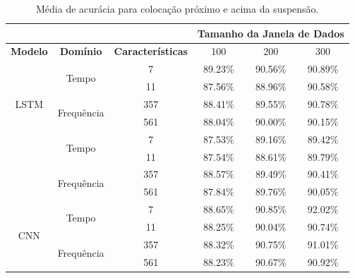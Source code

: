 \begin{table}[h!]
\scriptsize
\centering
\caption{Média de acurácia para colocação próximo e acima da suspensão.}
\label{table:above_suspension_results_tipo_superficie_2}
\begin{tabular}{cccccc}
\cmidrule(l){4-6}
 & \multicolumn{1}{l}{\textbf{}} & \multicolumn{1}{l}{} & \multicolumn{3}{c}{\textbf{Tamanho da Janela de Dados}} \\ \midrule
\textbf{Modelo} & \textbf{Domínio} & \textbf{Características} & \multicolumn{1}{c}{100} & \multicolumn{1}{c}{200} & \multicolumn{1}{c}{300} \\ \midrule
\multirow{5}{*}{LSTM} & \multirow{2}{*}{Tempo} & 7 & 89.23\% & 90.56\% & \cellcolor[HTML]{34FF34}90.89\% \\ \cmidrule(l){3-6} 
 &  & 11 & 87.56\% & 88.96\% & 90.58\% \\ \cmidrule(l){2-6} 
 & \multirow{2}{*}{Frequência} & 357 & 88.41\% & 89.55\% & 90.78\% \\ \cmidrule(l){3-6} 
 &  & 561 & 88.04\% & 90.00\% & 90.15\% \\ \midrule
\multirow{5}{*}{GRU} & \multirow{2}{*}{Tempo} & 7 & 87.53\% & 89.16\% & 89.42\% \\ \cmidrule(l){3-6} 
 &  & 11 & 87.54\% & 88.61\% & 89.79\% \\ \cmidrule(l){2-6} 
 & \multirow{2}{*}{Frequência} & 357 & 88.57\% & 89.49\% & \cellcolor[HTML]{34FF34}90.41\% \\ \cmidrule(l){3-6} 
 &  & 561 & 87.84\% & 89.76\% & 90.05\% \\ \midrule
\multirow{5}{*}{CNN} & \multirow{2}{*}{Tempo} & 7 & 88.65\% & 90.85\% & \cellcolor[HTML]{34FF34}92.02\% \\ \cmidrule(l){3-6} 
 &  & 11 & 88.25\% & 90.04\% & 90.74\% \\ \cmidrule(l){2-6} 
 & \multirow{2}{*}{Frequência} & 357 & 88.32\% & 90.75\% & 91.01\% \\ \cmidrule(l){3-6} 
 &  & 561 & 88.23\% & 90.67\% & 90.92\% \\ \bottomrule
\end{tabular}
\end{table}

